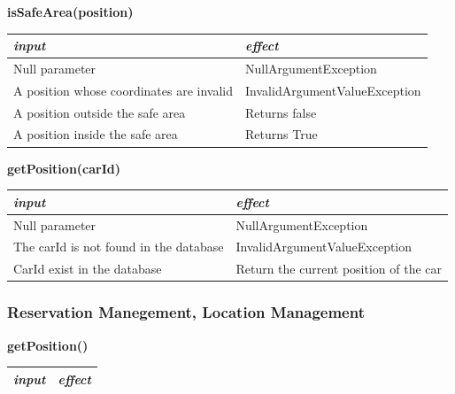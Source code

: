 \documentclass{article}
\begin{document}
\begin{flushleft}
        \begin{center}
   \begin {flushleft}
    \textbf{isSafeArea(position)}
    \end{flushleft}
        \begin{tabular}{  |  p{6cm} | p{6cm} |}
    \hline
    \textit{input} &  \textit{effect} \\
    \hline
    
    Null parameter & NullArgumentException
     \\ 
  \hline
   A position whose coordinates are invalid & InvalidArgumentValueException \\
  \hline
  A position outside the safe area & Returns false    \\
  \hline
  A position inside the safe area & Returns True \\
  \hline
    \end{tabular}
\end{center}

  \begin{center}
   \begin {flushleft}
    \textbf{getPosition(carId)}
    \end{flushleft}
        \begin{tabular}{  |  p{6cm} | p{6cm} |}
    \hline
    \textit{input} &  \textit{effect} \\
    \hline
    
    Null parameter & NullArgumentException
     \\ 
  \hline
   The carId is not found in the database & InvalidArgumentValueException \\
  \hline
  CarId exist in the database & Return the current position of the car
   \\
  \hline
    \end{tabular}
\end{center}
      
      
      
      \subsubsection{Reservation Manegement, Location Management } %
      
        \begin{center}
   \begin {flushleft}
    \textbf{getPosition()}
    \end{flushleft}
        \begin{tabular}{  |  p{6cm} | p{6cm} |}
    \hline
    \textit{input} &  \textit{effect} \\
    \hline
    

\end{tabular}
\end{center}
\end{flushleft}
\end{document}
